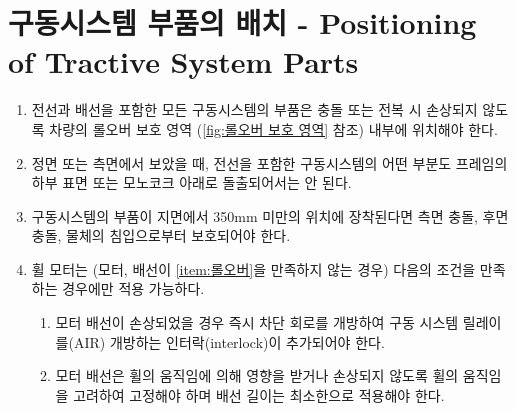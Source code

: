 \documentclass[final,a4paper,10pt]{report}
\begin{document}
\section{구동시스템 부품의 배치 - Positioning of Tractive System Parts}
\begin{enumerate}
  \item 전선과 배선을 포함한 모든 구동시스템의 부품은 충돌 또는 전복 시 손상되지 않도록 차량의 롤오버 보호 영역 (\cref{fig:롤오버 보호 영역} 참조) 내부에 위치해야 한다. \label{item:롤오버}
  \item 정면 또는 측면에서 보았을 때, 전선을 포함한 구동시스템의 어떤 부분도 프레임의 하부 표면 또는 모노코크 아래로 돌출되어서는 안 된다.
  
  
  \item 구동시스템의 부품이 지면에서 350mm 미만의 위치에 장착된다면 측면 충돌, 후면 충돌, 물체의 침입으로부터 보호되어야 한다.
  \item 휠 모터는 (모터, 배선이 \cref{item:롤오버}을 만족하지 않는 경우) 다음의 조건을 만족하는 경우에만 적용 가능하다.
    \begin{enumerate}
      \item 모터 배선이 손상되었을 경우 즉시 차단 회로를 개방하여 구동 시스템 릴레이를(AIR) 개방하는 인터락(interlock)이 추가되어야 한다.
      \item 모터 배선은 휠의 움직임에 의해 영향을 받거나 손상되지 않도록 휠의 움직임을 고려하여 고정해야 하며 배선 길이는 최소한으로 적용해야 한다.
    \end{enumerate}
\end{enumerate}
\end{document}
